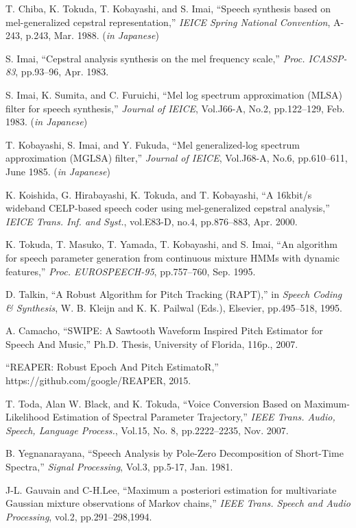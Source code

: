\begin{thebibliography}{99}
T. Chiba, K. Tokuda, T. Kobayashi, and S. Imai,
``Speech synthesis based on mel-generalized cepstral representation,''
{\sl IEICE Spring National Convention},
A-243, p.243, Mar. 1988. ({\sl in Japanese})

S. Imai, 
``Cepstral analysis synthesis on the mel frequency scale,''
{\sl Proc. ICASSP-83},
pp.93--96, Apr. 1983.

S. Imai, K. Sumita, and C. Furuichi,
``Mel log spectrum approximation (MLSA) filter for speech synthesis,''
{\sl Journal of IEICE},
Vol.J66-A, No.2, pp.122--129, Feb. 1983. ({\sl in Japanese})

T. Kobayashi, S. Imai, and Y. Fukuda, 
``Mel generalized-log spectrum approximation (MGLSA) filter,''
{\sl Journal of IEICE},
Vol.J68-A, No.6, pp.610--611, June 1985. ({\sl in Japanese})

K. Koishida, G. Hirabayashi, K. Tokuda, and T. Kobayashi, 
``A 16kbit/s wideband CELP-based speech coder using mel-generalized cepstral analysis,'' 
{\sl IEICE Trans. Inf. and Syst.},
vol.E83-D, no.4, pp.876--883, Apr. 2000.


K. Tokuda, T. Masuko, T. Yamada, T. Kobayashi, and S. Imai,
``An algorithm for speech parameter generation
  from continuous mixture HMMs with dynamic features,''
{\sl Proc. EUROSPEECH-95}, pp.757--760, Sep. 1995.

D. Talkin, ``A Robust Algorithm for Pitch Tracking (RAPT),''
in {\sl Speech Coding \& Synthesis}, W. B. Kleijn and K. K. Pailwal
(Eds.), Elsevier, pp.495--518, 1995.

A. Camacho, ``SWIPE: A Sawtooth Waveform Inspired Pitch Estimator for Speech And Music,''
Ph.D. Thesis, University of Florida, 116p., 2007.

``REAPER: Robust Epoch And Pitch EstimatoR,''
https://github.com/google/REAPER, 2015.

T. Toda, Alan W. Black, and K. Tokuda, ``Voice Conversion Based on Maximum-Likelihood
Estimation of Spectral Parameter Trajectory,''
{\sl IEEE Trans. Audio, Speech, Language Process.},
Vol.15, No. 8, pp.2222--2235, Nov. 2007.

B. Yegnanarayana, ``Speech Analysis by Pole-Zero Decomposition of Short-Time Spectra,''
{\sl Signal Processing}, Vol.3, pp.5-17, Jan. 1981.

J-L. Gauvain and C-H.Lee, ``Maximum a posteriori estimation for multivariate Gaussian mixture observations of Markov chains,''
{\sl IEEE Trans. Speech and Audio Processing}, vol.2, pp.291--298,1994. 

\end{thebibliography}